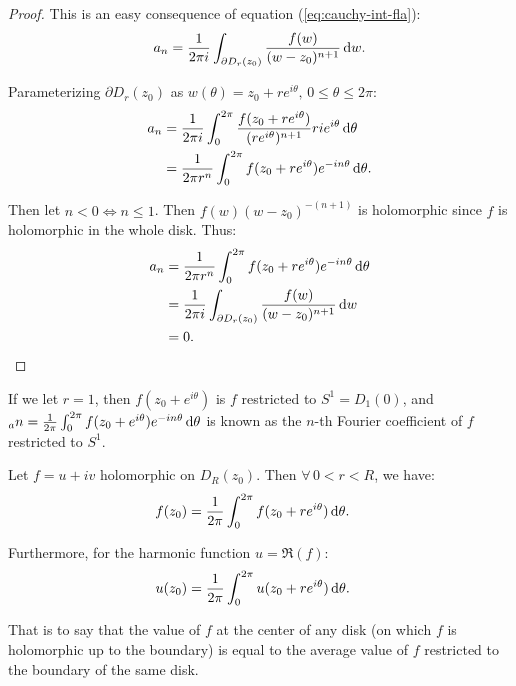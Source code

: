 \begin{proof}
This is an easy consequence of equation (\ref{eq:cauchy-int-fla}):
\begin{align*}
    a_n = \frac{1}{2 \pi i} \int_{\partial D_r(z_0)} \frac{f(w)}{(w-z_0)^{n+1}} \dif w.
\end{align*}

Parameterizing $\partial D_r(z_0)$ as $w(\theta) = z_0 + re^{i \theta}, \, 0 \leq \theta \leq 2 \pi$:
\begin{align*}
    a_n &= \frac{1}{2 \pi i} \int_0^{2 \pi}  \frac{f(z_0+re^{i \theta  })}{(re^{i \theta})^{n+1}  } r i e^{i\theta} \dif \theta\\
    &= \frac{1}{2 \pi r^n} \int_0^{2 \pi} f(z_0+re^{i \theta} ) e^{-i n \theta} \dif \theta.
\end{align*}

Then let $n<0 \Leftrightarrow n \leq 1$. Then $f(w)(w-z_0)^{-(n+1)}$ is holomorphic since $f$ is holomorphic in the whole disk. Thus:
\begin{align*}
    a_n &= \frac{1}{2 \pi r^n} \int_0^{2 \pi} f(z_0+re^{i \theta} ) e^{-i n \theta} \dif \theta\\ &= \frac{1}{2 \pi i} \int_{\partial D_r(z_0)} \frac{f(w)}{(w-z_0)^{n+1}} \dif w\\
    &= 0.
\end{align*}


\end{proof}

\begin{note}
If we let $r=1$, then $f(z_0 + e^{i \theta})$ is $f$ restricted to $S^1 = D_1(0)$, and $_an = \frac{1}{2 \pi } \int_0^{2 \pi} f(z_0+e^{i \theta} ) e^{-i n \theta} \dif \theta$ is known as the $n$-th Fourier coefficient of $f$ restricted to $S^1$.
\end{note}

\begin{corollary}\label{cor:mean-val-prop}

Let $f=u+iv$ holomorphic on $D_R(z_0)$. Then $\forall \, 0 < r < R$, we have:
\begin{align*}
    f(z_0) &= \frac{1}{2 \pi} \int_0^{2 \pi} f( z_0 + r e^{i \theta} ) \dif \theta.
\end{align*}

Furthermore, for the harmonic function $u = \Re (f)$:
\begin{align*}
    u(z_0) &= \frac{1}{2 \pi} \int_0^{2 \pi} u( z_0 + r e^{i \theta} ) \dif \theta.
\end{align*}

That is to say that the value of $f$ at the center of any disk (on which $f$ is holomorphic up to the boundary) is equal to the average value of $f$ restricted to the boundary of the same disk.
\end{corollary}

